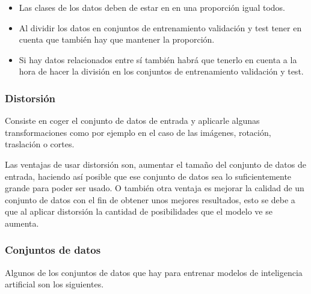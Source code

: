 \documentclass[12pt,a4paper]{article}
\begin{document}
\begin{itemize}
\item Las clases de los datos deben de estar en en una proporción igual todos.
\item Al dividir los datos en conjuntos de entrenamiento validación y test tener en cuenta que también hay que mantener la proporción.
\item Si hay datos relacionados entre sí también habrá que tenerlo en cuenta a la hora de hacer la división en los conjuntos de entrenamiento validación y test.

\end{itemize}

\subsubsection{Distorsión}
Consiste en coger el conjunto de datos de entrada y aplicarle algunas transformaciones como por ejemplo en el caso de las imágenes, rotación, traslación o cortes.
\bigskip

Las ventajas de usar distorsión son, aumentar el tamaño del conjunto de datos de entrada, haciendo así posible que ese conjunto de datos sea lo suficientemente grande para poder ser usado. O también otra ventaja es mejorar la calidad de un conjunto de datos con el fin de obtener unos mejores resultados, esto se debe a que al aplicar distorsión la cantidad de posibilidades que el modelo ve se aumenta.


\subsubsection{Conjuntos de datos}
Algunos de los conjuntos de datos que hay para entrenar modelos de inteligencia artificial son los siguientes.
\end{document}
